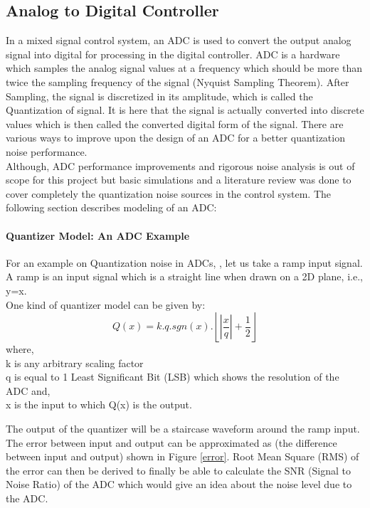 \documentclass[a4paper,12pt]{article}
\begin{document}
	\subsection{Analog to Digital Controller}
	In a mixed signal control system, an ADC is used to convert the output analog signal into digital for processing in the digital controller. ADC is a hardware which samples the analog signal values at a frequency which should be more than twice the sampling frequency of the signal (Nyquist Sampling Theorem). After Sampling, the signal is discretized in its amplitude, which is called the Quantization of signal. It is here that the signal is actually converted into discrete values which is then called the converted digital form of the signal. There are various ways to improve upon the design of an ADC for a better quantization noise performance.\\
	
	Although, ADC performance improvements and rigorous noise analysis is out of scope for this project but basic simulations and a literature review was done to cover completely the quantization noise sources in the control system. The following section describes modeling of an ADC:
	\paragraph{Quantizer Model: An ADC Example}
 	For an example on Quantization noise in ADCs, \cite{Quantization}, let us take a ramp input signal. A ramp is an input signal which is a straight line when drawn on a 2D plane, i.e., y=x.\\
One kind of quantizer model can be given by:
\begin{equation}
Q(x)=k.q.sgn(x).\left\lfloor\left|\frac{x}{q}\right|+\frac{1}{2}\right\rfloor
\end{equation}
 where,\\ k is any arbitrary scaling factor\\
 q is equal to 1 Least Significant Bit (LSB) which shows the resolution of the ADC
 and, \\
 x is the input to which Q(x) is the output.
 
   
The output of the quantizer will be a staircase waveform around the ramp input. 
% 
%		
The error between input and output can be approximated as (the difference between input and output) shown in Figure \ref{error}. Root Mean Square (RMS) of the error can then be derived to finally be able to calculate the SNR (Signal to Noise Ratio) of the ADC which would give an idea about the noise level due to the ADC.
\end{document}
